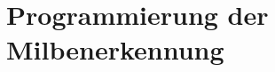 \documentclass[11pt,a4paper]{article}
\begin{document}





\newpage
\section{Programmierung der Milbenerkennung} \label{section:Programmierung}
\end{document}
